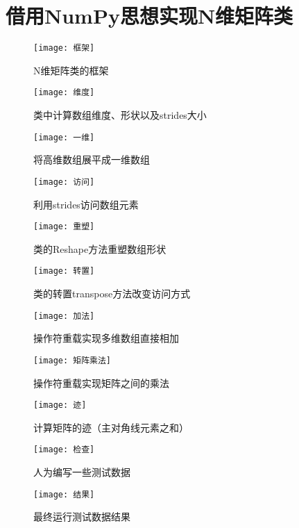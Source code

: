\documentclass[10pt]{article}
\begin{document}
	\section{借用NumPy思想实现N维矩阵类}
	\begin{figure}[H]
		\centering
		\texttt{[image: 框架]}
		\caption{N维矩阵类的框架}
	\end{figure}
		\begin{figure}[H]
		\centering
		\texttt{[image: 维度]}
		\caption{类中计算数组维度、形状以及strides大小}
	\end{figure}
		\begin{figure}[H]
		\centering
		\texttt{[image: 一维]}
		\caption{将高维数组展平成一维数组}
	\end{figure}
		\begin{figure}[H]
		\centering
		\texttt{[image: 访问]}
		\caption{利用strides访问数组元素}
	\end{figure}
	\begin{figure}[H]
		\centering
		\texttt{[image: 重塑]}
		\caption{类的Reshape方法重塑数组形状}
	\end{figure}
		\begin{figure}[H]
		\centering
		\texttt{[image: 转置]}
		\caption{类的转置transpose方法改变访问方式}
	\end{figure}
		\begin{figure}[H]
		\centering
		\texttt{[image: 加法]}
		\caption{操作符重载实现多维数组直接相加}
	\end{figure}
	\begin{figure}[H]
		\centering
		\texttt{[image: 矩阵乘法]}
		\caption{操作符重载实现矩阵之间的乘法}
	\end{figure}
	\begin{figure}[H]
		\centering
		\texttt{[image: 迹]}
		\caption{计算矩阵的迹（主对角线元素之和）}
	\end{figure}
	\begin{figure}[H]
		\centering
		\texttt{[image: 检查]}
		\caption{人为编写一些测试数据}
	\end{figure}
	\begin{figure}[H]
		\centering
		\texttt{[image: 结果]}
		\caption{最终运行测试数据结果}
	\end{figure}
\end{document}

